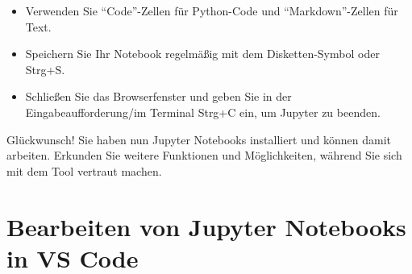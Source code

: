 \documentclass[
  nswissgerman,
  a4paper,
  DIV=11,
  numbers=noendperiod,
  ngerman]{scrreprt}
\providecommand{\tightlist}{%
  \setlength{\itemsep}{0pt}\setlength{\parskip}{0pt}}
\begin{document}
\begin{itemize}
\tightlist
\item
  Verwenden Sie ``Code''-Zellen für Python-Code und ``Markdown''-Zellen
  für Text.
\item
  Speichern Sie Ihr Notebook regelmäßig mit dem Disketten-Symbol oder
  Strg+S.
\item
  Schließen Sie das Browserfenster und geben Sie in der
  Eingabeaufforderung/im Terminal Strg+C ein, um Jupyter zu beenden.
\end{itemize}

Glückwunsch! Sie haben nun Jupyter Notebooks installiert und können
damit arbeiten. Erkunden Sie weitere Funktionen und Möglichkeiten,
während Sie sich mit dem Tool vertraut machen.

\section{Bearbeiten von Jupyter Notebooks in VS
Code}\label{bearbeiten-von-jupyter-notebooks-in-vs-code}
\end{document}
